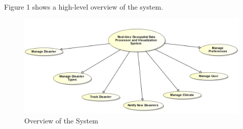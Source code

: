 Figure 1 shows a high-level overview of the system.
\begin{figure}[H]
	\centering
	\includegraphics[width=1.2\textwidth]{../images/funcReq/systOverview.jpg}
	\caption{ Overview of the System \label{overflow}}
\end{figure}